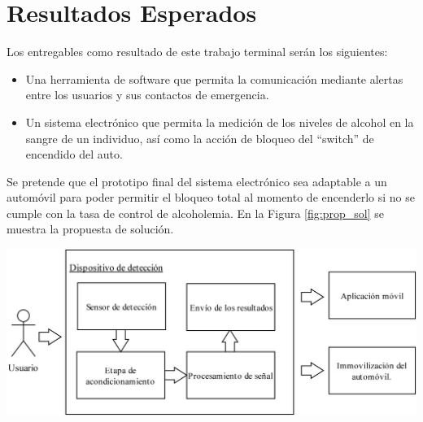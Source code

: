 \section{Resultados Esperados}
Los entregables como resultado de este trabajo terminal serán los siguientes:
\begin{itemize}
    \item Una herramienta de software que permita la comunicación mediante alertas entre los usuarios y sus contactos de emergencia.
    \item Un sistema electrónico que permita la medición de los niveles de alcohol en la sangre de un individuo, así como la acción de bloqueo del “switch” de encendido del auto.
\end{itemize}
Se pretende que el prototipo final del sistema electrónico sea adaptable a un automóvil para poder permitir el bloqueo total al momento de encenderlo si no se cumple con la tasa de control de alcoholemia. En la Figura \ref{fig:prop_sol} se muestra la propuesta de solución.
\begin{center}
\includegraphics[scale=1]{Capitulo1/img/propuesta_de_solucion.jpg}
\label{fig:prop_sol}
\end{center}